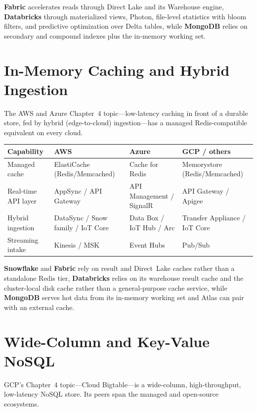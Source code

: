 \noindent \textbf{Fabric} accelerates reads through Direct Lake and its Warehouse engine,
\textbf{Databricks} through materialized views, Photon, file-level statistics with bloom filters,
and predictive optimization over Delta tables, while \textbf{MongoDB} relies on secondary and
compound indexes plus the in-memory working set.

\section{In-Memory Caching and Hybrid Ingestion}
%
The AWS and Azure Chapter~4 topic---low-latency caching in front of a durable store, fed by hybrid
(edge-to-cloud) ingestion---has a managed Redis-compatible equivalent on every cloud.

\begin{center}
\footnotesize
\begin{tabular}{@{}p{2.8cm}p{3.0cm}p{3.0cm}p{3.4cm}@{}}
\toprule
\textbf{Capability} & \textbf{AWS} & \textbf{Azure} & \textbf{GCP / others} \\
\midrule
Managed cache & ElastiCache (Redis/Memcached) & Cache for Redis & Memorystore (Redis/Memcached) \\
Real-time API layer & AppSync / API Gateway & API Management / SignalR & API Gateway / Apigee \\
Hybrid ingestion & DataSync / Snow family / IoT Core & Data Box / IoT Hub / Arc & Transfer Appliance / IoT Core \\
Streaming intake & Kinesis / MSK & Event Hubs & Pub/Sub \\
\bottomrule
\end{tabular}
\end{center}

\noindent \textbf{Snowflake} and \textbf{Fabric} rely on result and Direct~Lake caches rather than a
standalone Redis tier, \textbf{Databricks} relies on its warehouse result cache and the
cluster-local disk cache rather than a general-purpose cache service, while \textbf{MongoDB}
serves hot data from its in-memory working set and Atlas can pair with an external cache.

\section{Wide-Column and Key-Value NoSQL}
%
GCP's Chapter~4 topic---Cloud Bigtable---is a wide-column, high-throughput, low-latency NoSQL store.
Its peers span the managed and open-source ecosystems.


